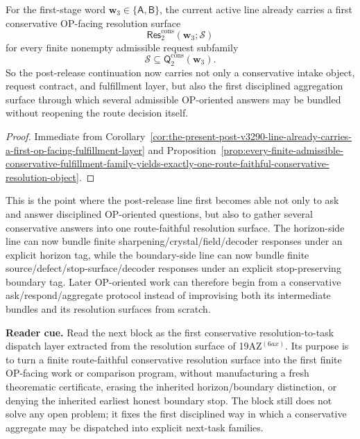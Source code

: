 \begin{corollary}
\label{cor:the-present-post-v3290-line-already-carries-a-first-op-facing-conservative-resolution-surface}
For the first-stage word \(\mathbf w_3\in\{\mathsf A,\mathsf B\}\), the current active line already carries a first conservative OP-facing resolution surface
\[
 \mathsf{Res}^{\mathrm{cons}}_{2}(\mathbf w_3;\mathcal S)
\]
for every finite nonempty admissible request subfamily
\[
 \mathcal S\subseteq \mathsf{Q}^{\mathrm{cons}}_{2}(\mathbf w_3).
\]
So the post-release continuation now carries not only a conservative intake object, request contract, and fulfillment layer, but also the first disciplined aggregation surface through which several admissible OP-oriented answers may be bundled without reopening the route decision itself.
\end{corollary}

\begin{proof}
Immediate from Corollary~\ref{cor:the-present-post-v3290-line-already-carries-a-first-op-facing-fulfillment-layer} and Proposition~\ref{prop:every-finite-admissible-conservative-fulfillment-family-yields-exactly-one-route-faithful-conservative-resolution-object}.
\end{proof}

\begin{remark}
\label{rem:what-the-first-conservative-op-facing-response-aggregation-resolution-layer-now-buys}
This is the point where the post-release line first becomes able not only to ask and answer disciplined OP-oriented questions, but also to gather several conservative answers into one route-faithful resolution surface. The horizon-side line can now bundle finite sharpening/crystal/field/decoder responses under an explicit horizon tag, while the boundary-side line can now bundle finite source/defect/stop-surface/decoder responses under an explicit stop-preserving boundary tag. Later OP-oriented work can therefore begin from a conservative ask/respond/aggregate protocol instead of improvising both its intermediate bundles and its resolution surfaces from scratch.
\end{remark}


\noindent\textbf{Reader cue.} Read the next block as the first conservative resolution-to-task dispatch layer extracted from the resolution surface of 19AZ$^{(6ax)}$. Its purpose is to turn a finite route-faithful conservative resolution surface into the first finite OP-facing work or comparison program, without manufacturing a fresh theorematic certificate, erasing the inherited horizon/boundary distinction, or denying the inherited earliest honest boundary stop. The block still does not solve any open problem; it fixes the first disciplined way in which a conservative aggregate may be dispatched into explicit next-task families.

